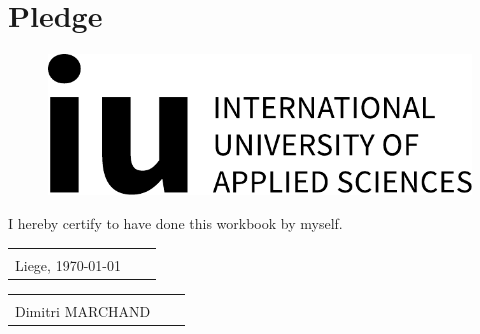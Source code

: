 \chapter*{Pledge}

\begin{figure}[t!]
    \raggedleft
    \includegraphics[scale=0.3]{logo.pdf}
\end{figure}

\thispagestyle{empty} %

I hereby certify to have done this workbook by myself.


\vspace{1,5 cm} 
\begin{tabular}{p{7cm}p{.5cm}l}
\dotfill \\ 
Liege, \today
\end{tabular}%
\hfill 
\begin{tabular}{p{7cm}p{.5cm}l}
\dotfill \\ 
Dimitri MARCHAND
\end{tabular}%